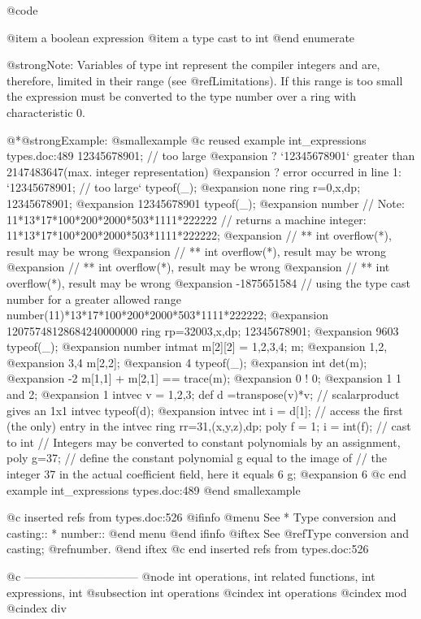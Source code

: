 @code{%
@item a boolean expression
@item
a type cast to int
@end enumerate

@strong{Note:}
Variables of type int represent the compiler integers  and are, therefore,
limited  in their range (see @ref{Limitations}). If this range is too small
the expression must be converted to the type number over a ring with
characteristic 0.

@*@strong{Example:}
@smallexample
@c reused example int_expressions types.doc:489 
12345678901; // too large
@expansion{}    ? `12345678901` greater than 2147483647(max. integer representation)
@expansion{}    ? error occurred in line 1: `12345678901; // too large`
typeof(_);
@expansion{} none
ring r=0,x,dp;
12345678901;
@expansion{} 12345678901
typeof(_);
@expansion{} number
// Note: 11*13*17*100*200*2000*503*1111*222222
// returns a machine integer:
11*13*17*100*200*2000*503*1111*222222;
@expansion{} // ** int overflow(*), result may be wrong
@expansion{} // ** int overflow(*), result may be wrong
@expansion{} // ** int overflow(*), result may be wrong
@expansion{} // ** int overflow(*), result may be wrong
@expansion{} -1875651584
// using the type cast number for a greater allowed range
number(11)*13*17*100*200*2000*503*1111*222222;
@expansion{} 12075748128684240000000
ring rp=32003,x,dp;
12345678901;
@expansion{} 9603
typeof(_);
@expansion{} number
intmat m[2][2] = 1,2,3,4;
m;
@expansion{} 1,2,
@expansion{} 3,4 
m[2,2];
@expansion{} 4
typeof(_);
@expansion{} int
det(m);
@expansion{} -2
m[1,1] + m[2,1] == trace(m);
@expansion{} 0
! 0;
@expansion{} 1
1 and 2;
@expansion{} 1
intvec v = 1,2,3;
def d =transpose(v)*v;    // scalarproduct gives an 1x1 intvec
typeof(d);
@expansion{} intvec
int i = d[1];             // access the first (the only) entry in the intvec
ring rr=31,(x,y,z),dp;
poly f = 1;
i = int(f);               // cast to int
// Integers may be converted to constant  polynomials by an assignment,
poly g=37;
// define the constant polynomial g equal to the image of
// the integer 37 in the actual coefficient field, here it equals 6
g;
@expansion{} 6
@c end example int_expressions types.doc:489
@end smallexample

@c inserted refs from types.doc:526
@ifinfo
@menu
See
* Type conversion and casting::
* number::
@end menu
@end ifinfo
@iftex
See
@ref{Type conversion and casting};
@ref{number}.
@end iftex
@c end inserted refs from types.doc:526

@c ------------------------------
@node int operations, int related functions, int expressions, int
@subsection int operations
@cindex int operations
@cindex mod
@cindex div

}
